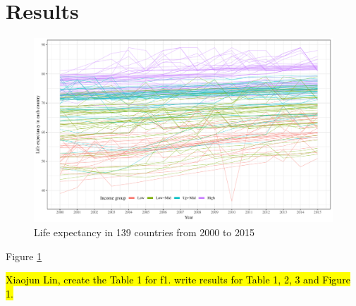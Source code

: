 \documentclass[]{elsarticle} %
\makeatletter
\def\maxwidth{\ifdim\Gin@nat@width>\linewidth\linewidth
\else\Gin@nat@width\fi}
\let\Oldincludegraphics\includegraphics
\renewcommand{\includegraphics}[1]{\Oldincludegraphics[width=\maxwidth]{#1}}
\makeatother
\begin{document}
\hypertarget{results}{%
\section{Results}\label{results}}

\begin{figure}
\centering
\includegraphics{Figures/fig1.pdf}
\caption{\label{fig:fig1}Life expectancy in 139 countries from 2000 to 2015}
\end{figure}

Figure \ref{fig:fig1}

\hl{Xiaojun Lin, create the Table 1 for f1. write results for Table 1, 2, 3 and Figure 1.}
\end{document}
